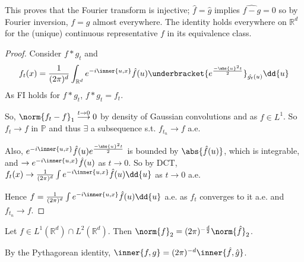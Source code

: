 \begin{remark}
	This proves that the Fourier transform is injective; $\hat f = \hat g$ implies $\widehat{f - g} = 0$ so by Fourier inversion, $f = g$ almost everywhere.
	The identity holds everywhere on $\mathbb R^d$ for the (unique) continuous representative $f$ in its equivalence class.
\end{remark}

\begin{proof}
	Consider $f \ast g_t$ and
	\begin{align*}
		f_t(x) = \frac{1}{(2\pi)^d} \int_{\mathbb R^d} e^{-i\inner{u,x}} \hat f(u) \underbracket{e^{\frac{-\abs{u}^2 t}{2}}}_{\hat{g_t}(u)} \dd{u}
	\end{align*}
	As FI holds for $f \ast g_t$, $f \ast g_t = f_t$.

	So, $\norm{f_t - f}_1 \overset{t \to 0}{\longrightarrow} 0$ by density of Gaussian convolutions and as $f \in L^1$.
	So $f_t \to f$ in $\mathbb{P}$ and thus $\exists$ a subsequence s.t. $f_{t_n} \to f$ a.e.

	Also, $e^{-i\inner{u,x}} \hat f(u) e^{\frac{-\abs{u}^2 t}{2}}$ is bounded by $\abs{\hat f(u)}$, which is integrable, and $\to e^{-i\inner{u,x}} \hat f(u)$ as $t \to 0$.
	So by DCT, $f_t(x) \to \frac{1}{(2\pi)^d} \int e^{-i\inner{u,x}} \hat f(u) \dd{u}$ as $t \to 0$ a.e.

	Hence $f = \frac{1}{(2\pi)^d} \int e^{-i\inner{u,x}} \hat f(u) \dd{u}$ a.e. as $f_t$ converges to it a.e. and $f_{t_n} \to f$.
\end{proof}

\begin{theorem}[Plancherel]
	Let $f \in L^1(\mathbb R^d) \cap L^2(\mathbb R^d)$.
	Then $\norm{f}_2 = (2\pi)^{-\frac{d}{2}} \norm{\hat f}_2$.
\end{theorem}

\begin{remark}
	By the Pythagorean identity, $\inner{f, g} = (2\pi)^{-d} \inner{\hat f, \hat g}$.
\end{remark}

